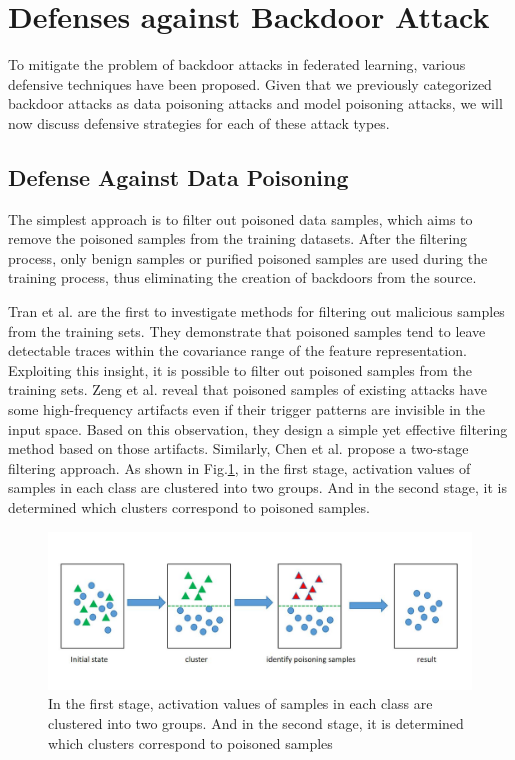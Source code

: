 \documentclass[conference]{IEEEtran}
\begin{document}
\section{Defenses against Backdoor Attack}
To mitigate the problem of backdoor attacks in
federated learning, various defensive techniques have been proposed.
Given that we previously categorized backdoor attacks as data poisoning
attacks and model poisoning attacks, we will now discuss defensive strategies
for each of these attack types.

\subsection{Defense Against Data Poisoning}
The simplest approach is to filter out poisoned data samples,
which aims to remove the poisoned samples from the training datasets.
After the filtering process, only benign samples or purified poisoned
samples are used during the training process, thus eliminating the
creation of backdoors from the source.

Tran et al.\cite{b67} are the first to investigate methods for filtering out malicious
samples from the training sets. They demonstrate that poisoned samples tend to
leave detectable traces within the covariance range of the feature representation.
Exploiting this insight, it is possible to filter out poisoned samples from
the training sets. Zeng et al. \cite{b68} reveal that poisoned samples of
existing attacks have some high-frequency artifacts even if their trigger
patterns are invisible in the input space. Based on this observation,
they design a simple yet effective filtering method based on those artifacts.
Similarly, Chen et al. \cite{b69}propose a two-stage filtering approach.
As shown in Fig.\ref{fig9}, in the first stage, activation values of samples in each class are clustered
into two groups. And in the second stage, it is determined which clusters
correspond to poisoned samples.


\begin{figure}[htbp]
    \centerline{\includegraphics[width=0.8\linewidth,height=0.3\linewidth]{picture/two-stage-cluster.png}}
    \caption{In the first stage, activation values of samples in each class are clustered
    into two groups. And in the second stage, it is determined which clusters
    correspond to poisoned samples}
    \label{fig9}
\end{figure}
\end{document}
